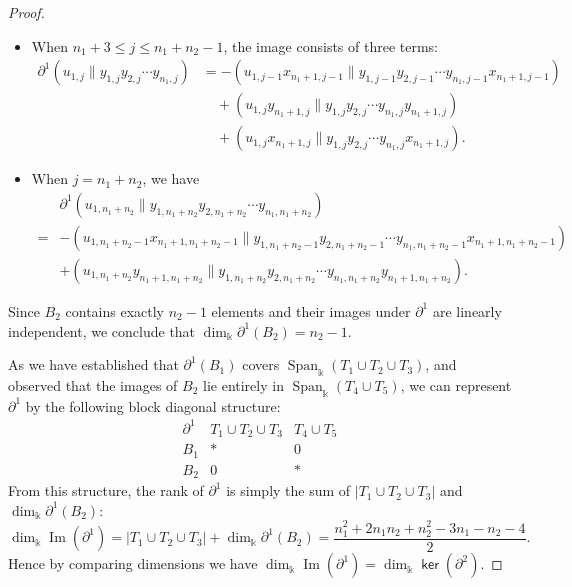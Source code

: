 \documentclass[a4paper, reqno, 11pt]{amsart}
\theoremstyle{definition}
\newcommand{\opname}[1]{\operatorname{\mathsf{#1}}}
\renewcommand{\ker}{\opname{ker}\nolimits}
\begin{document}
\begin{proof}
\begin{enumerate}[leftmargin=*, itemindent=0pt, labelindent=0pt, labelsep=0.5em]
\begin{itemize}[label=--]
			
			\item When $n_1+3 \le j \le n_1+n_2-1$, the image consists of three terms:
			\[
			\begin{aligned}
				\partial^1(u_{1,j} \parallel y_{1,j}y_{2,j}\cdots y_{n_1,j}) &= - (u_{1,j-1}x_{n_1+1,j-1} \parallel y_{1,j-1}y_{2,j-1}\cdots y_{n_1,j-1}x_{n_1+1,j-1}) \\
				&\quad + (u_{1,j}y_{n_1+1,j} \parallel y_{1,j}y_{2,j}\cdots y_{n_1,j}y_{n_1+1,j}) \\
				&\quad + (u_{1,j}x_{n_1+1,j} \parallel y_{1,j}y_{2,j}\cdots y_{n_1,j}x_{n_1+1,j}).
			\end{aligned}
			\]
			
			\item When $j = n_1+n_2$, we have
			\[
			\begin{aligned}
				&\partial^1 (u_{1,n_1+n_2} \parallel y_{1,n_1+n_2}y_{2,n_1+n_2}\cdots y_{n_1,n_1+n_2}) \\
				=& - (u_{1,n_1+n_2-1}x_{n_1+1,n_1+n_2-1} \parallel y_{1,n_1+n_2-1}y_{2,n_1+n_2-1}\cdots y_{n_1,n_1+n_2-1}x_{n_1+1,n_1+n_2-1})\\
				&+ (u_{1,n_1+n_2}y_{n_1+1,n_1+n_2} \parallel y_{1,n_1+n_2}y_{2,n_1+n_2}\cdots y_{n_1,n_1+n_2} y_{n_1+1,n_1+n_2}).
			\end{aligned}
			\]
		\end{itemize}
		
		Since $B_2$ contains exactly $n_2 - 1$ elements and their images under $\partial^1$ are linearly independent, we conclude that \(\dim_\Bbbk \partial^1(B_2) = n_2 - 1.\)
	\end{enumerate}    
	
	As we have established that $\partial^1(B_1)$ covers $\operatorname{Span}_\Bbbk(T_1 \cup T_2 \cup T_3)$, and observed that the images of $B_2$ lie entirely in $\operatorname{Span}_\Bbbk(T_4 \cup T_5)$, we can represent $\partial^1$ by the following block diagonal structure:
	\[
	\begin{array}{c|cc}
		\partial^1 & T_1 \cup T_2 \cup T_3 & T_4 \cup T_5 \\
		\hline
		B_1 & * & 0 \\
		B_2 & 0 & *
	\end{array}
	\]
	From this structure, the rank of $\partial^1$ is simply the sum of $|T_1 \cup T_2\cup T_3|$ and $\dim_\Bbbk \partial^1(B_2)$:
	\[
	\dim_\Bbbk \operatorname{Im}(\partial^1) = |T_1 \cup T_2 \cup T_3| + \dim_\Bbbk \partial^1(B_2)=\frac{n_1^2 + 2n_1n_2 + n_2^2 - 3n_1 - n_2 - 4}{2}.
	\]
	Hence by comparing dimensions we have $\dim_\Bbbk \operatorname{Im}(\partial^1)=\dim_{\Bbbk}\ker(\partial^2)$.
	

\end{proof}
\end{document}
